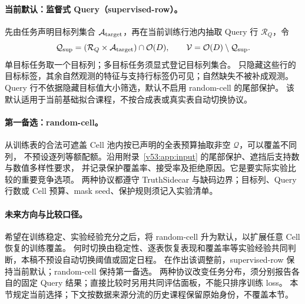 \documentclass[11pt,UTF8,fontset=fandol]{ctexart}
\numberwithin{equation}{section}
\theoremstyle{definition}
\newcommand{\Oset}{\mathcal O}
\newcommand{\Vset}{\mathcal V}
\newcommand{\Qset}{\mathcal Q}
\begin{document}
\paragraph{当前默认：监督式 Query（supervised-row）。}
先由任务声明目标列集合 $\mathcal A_{\rm target}$，再在当前训练行池内抽取 Query 行 $\mathcal R_Q$，令
\begin{equation}
 \Qset_{\rm sup}=(\mathcal R_Q\times\mathcal A_{\rm target})\cap\Oset(D),
 \qquad \Vset=\Oset(D)\setminus\Qset_{\rm sup}.
 \label{v54:eq:supervised-query}
\end{equation}
单目标任务取一个目标列；多目标任务须显式登记目标列集合。
只隐藏这些行的目标标签，其余自然观测的特征与支持行标签仍可见；自然缺失不被补成观测。
Query 行不依据隐藏目标值大小筛选，默认不启用 random-cell 的尾部保护。
该默认适用于当前基础拟合课程，不按合成表或真实表自动切换协议。

\paragraph{第一备选：random-cell。}
从训练表的合法可遮盖 Cell 池内按已声明的全表预算抽取非空 $\Qset$，可以覆盖不同列，
不预设逐列等额配额。沿用附录~\ref{v53:app:input} 的尾部保护、遮挡后支持数与数值多样性要求，
并记录保护覆盖率、接受率及拒绝原因。它是要实际实验比较的重要竞争选项。
两种协议都遵守 TruthSidecar 与缺码边界；目标列、Query 行数或 Cell 预算、mask seed、保护规则须记入实验清单。

\paragraph{未来方向与比较口径。}
希望在训练稳定、实验经验充分之后，将 random-cell 升为默认，以扩展任意 Cell 恢复的训练覆盖。
何时切换由稳定性、逐表恢复表现和覆盖率等实验经验共同判断，本稿不预设自动切换阈值或固定日程。
在作出该调整前，supervised-row 保持当前默认；random-cell 保持第一备选。
两种协议改变任务分布，须分别报告各自的固定 Query 结果；直接比较时另用共同评估面板，不能只排序训练 loss。
本节规定当前选择；下文按数据来源分流的历史课程保留原始身份，不覆盖本节。
\end{document}
